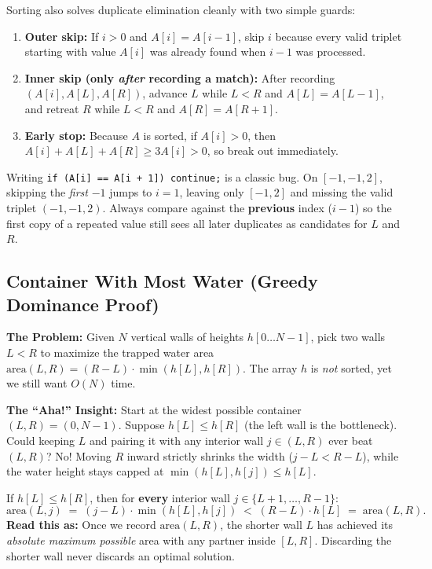 \documentclass[11pt,a4paper]{article}
\theoremstyle{definition}
\newcommand{\painbeat}{\textbf{\color{accentamber}The Problem:} }
\newcommand{\ahabeat}{\textbf{\color{accentteal}The ``Aha!'' Insight:} }
\begin{document}
Sorting also solves duplicate elimination cleanly with two simple guards:
\begin{enumerate}[itemsep=2pt, topsep=2pt]
    \item \textbf{Outer skip:} If $i > 0$ and $A[i] = A[i - 1]$, skip $i$ because every valid triplet starting with value $A[i]$ was already found when $i - 1$ was processed.
    \item \textbf{Inner skip (only \emph{after} recording a match):} After recording $(A[i], A[L], A[R])$, advance $L$ while $L < R$ and $A[L] = A[L - 1]$, and retreat $R$ while $L < R$ and $A[R] = A[R + 1]$.
    \item \textbf{Early stop:} Because $A$ is sorted, if $A[i] > 0$, then $A[i] + A[L] + A[R] \ge 3 A[i] > 0$, so break out immediately.
\end{enumerate}

\begin{watchoutbox}
Writing \texttt{if (A[i] == A[i + 1]) continue;} is a classic bug. On $[-1, -1, 2]$, skipping the \emph{first} $-1$ jumps to $i = 1$, leaving only $[-1, 2]$ and missing the valid triplet $(-1, -1, 2)$. Always compare against the \textbf{previous} index ($i - 1$) so the first copy of a repeated value still sees all later duplicates as candidates for $L$ and $R$.
\end{watchoutbox}

\subsection{Container With Most Water (Greedy Dominance Proof)}

\painbeat Given $N$ vertical walls of heights $h[0 \dots N-1]$, pick two walls $L < R$ to maximize the trapped water area $\text{area}(L, R) = (R - L) \cdot \min(h[L], h[R])$. The array $h$ is \emph{not} sorted, yet we still want $O(N)$ time.

\ahabeat Start at the widest possible container $(L, R) = (0, N - 1)$. Suppose $h[L] \le h[R]$ (the left wall is the bottleneck). Could keeping $L$ and pairing it with any interior wall $j \in (L, R)$ ever beat $(L, R)$? No! Moving $R$ inward strictly shrinks the width ($j - L < R - L$), while the water height stays capped at $\min(h[L], h[j]) \le h[L]$.

\begin{formulabox}
If $h[L] \le h[R]$, then for \textbf{every} interior wall $j \in \{L+1, \dots, R-1\}$:
$$\text{area}(L, j) \;=\; (j - L) \cdot \min(h[L], h[j]) \;<\; (R - L) \cdot h[L] \;=\; \text{area}(L, R).$$
\textbf{Read this as:} Once we record $\text{area}(L, R)$, the shorter wall $L$ has achieved its \emph{absolute maximum possible} area with any partner inside $[L, R]$. Discarding the shorter wall never discards an optimal solution.
\end{formulabox}
\end{document}
